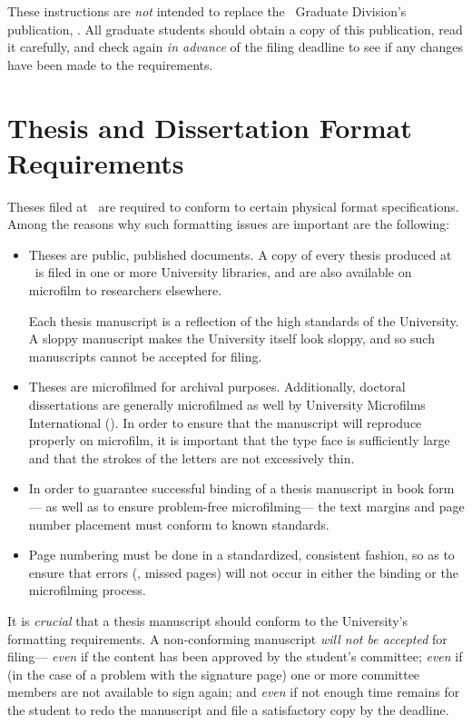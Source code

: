 These instructions are {\em not\/} intended to replace
the \ucla\ Graduate Division's publication, \regs.
All graduate students should obtain a copy of this publication,
read it carefully, and check again {\em in advance\/}
of the filing deadline to see if any changes have been made
to the requirements.

\section {Thesis and Dissertation Format Requirements}

Theses filed at \ucla\ are required to conform
to certain physical format specifications.
Among the reasons why such formatting issues are important
are the following:

\begin {itemize}

\item
Theses are public, published documents.
A copy of every thesis produced at \ucla\
is filed in one or more University libraries,
and are also available on microfilm
to researchers elsewhere.

Each thesis manuscript is a reflection
of the high standards of the University.
A sloppy manuscript makes the University itself look sloppy,
and so such manuscripts cannot be accepted for filing.

\item
Theses are microfilmed for archival purposes.
Additionally, doctoral dissertations are generally
microfilmed as well by University Microfilms International (\umi).
In order to ensure that the manuscript
will reproduce properly on microfilm,
it is important that the type face is sufficiently large
and that the strokes of the letters are not excessively thin.

\item
In order to guarantee successful binding
of a thesis manuscript in book form---%
as well as to ensure problem-free microfilming---%
the text margins and page number placement
must conform to known standards.

\item
Page numbering must be done in a standardized, consistent fashion,
so as to ensure that errors (\eg, missed pages)
will not occur in either the binding or the microfilming process.

\end {itemize}

It is {\em crucial\/} that a thesis manuscript
should conform to the University's formatting requirements.
A non-conforming manuscript {\em will not be accepted\/} for filing---%
{\em even\/} if the content has been approved
by the student's committee;
{\em even\/} if (in the case of a problem with the signature page)
one or more committee members are not available to sign again;
and {\em even\/} if not enough time remains for the student
to redo the manuscript and file a satisfactory copy by the deadline.

